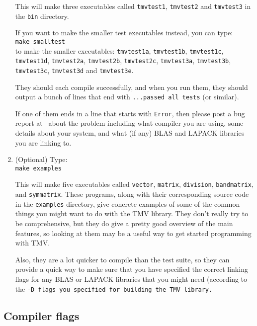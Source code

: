 \begin{enumerate}
This will make three executables called \texttt{tmvtest1}, 
\texttt{tmvtest2} and \texttt{tmvtest3} in the \texttt{bin} directory.

If you want to make the smaller test executables instead, you can type:\\
\texttt{make smalltest}\\
to make the smaller executables: \texttt{tmvtest1a}, \texttt{tmvtest1b}, \texttt{tmvtest1c}, \texttt{tmvtest1d}, \texttt{tmvtest2a}, \texttt{tmvtest2b}, \texttt{tmvtest2c}, \texttt{tmvtest3a}, \texttt{tmvtest3b}, \texttt{tmvtest3c}, 
\texttt{tmvtest3d} and \texttt{tmvtest3e}.

They should each compile successfully, and when you run them, they
should output a bunch of lines that end with \texttt{...passed all tests}
(or similar).  

If one of them ends in a line that starts with \texttt{Error}, 
then please post a bug report at \myissues\ about the problem including what compiler
you are using, some details about your system, and what (if any) BLAS and LAPACK
libraries you are linking to.

\item
(Optional) Type:\\
\texttt{make examples} 

This will make five executables called \texttt{vector}, \texttt{matrix}, \texttt{division},
\texttt{bandmatrix}, and \texttt{symmatrix}.
These programs, along with their corresponding source code in the \texttt{examples}
directory, give concrete examples of some of the common things you might want
to do with the TMV library.  They don't really try to be comprehensive,
but they do give a pretty good overview of the main features,
so looking at them may be a useful way to get started programming with TMV.

Also, they are a lot quicker to compile than the test suite, so they can provide a 
quick way to make sure that you have specified the correct linking flags for any
BLAS or LAPACK libraries that you might need (according to the \tt{-D} flags
you specified for building the TMV library.

\end{enumerate}

\subsection{Compiler flags}
\label{Install_Flags}

